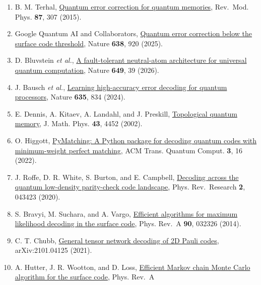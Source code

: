 \documentclass[
  10pt,
]{article}
\providecommand{\tightlist}{%
  \setlength{\itemsep}{0pt}\setlength{\parskip}{0pt}}
\begin{document}
\begin{enumerate}
\def\labelenumi{[\arabic{enumi}]}
\tightlist
\item
  \hypertarget{ref:1}{} B. M. Terhal, \href{https://doi.org/10.1103/RevModPhys.87.307}{Quantum
  error correction for quantum memories}, Rev.~Mod. Phys. \textbf{87},
  307 (2015).
\item
  \hypertarget{ref:2}{} Google Quantum AI and Collaborators,
  \href{https://doi.org/10.1038/s41586-024-08449-y}{Quantum error
  correction below the surface code threshold}, Nature \textbf{638}, 920
  (2025).
\item
  \hypertarget{ref:3}{} D. Bluvstein \emph{et al.},
  \href{https://doi.org/10.1038/s41586-025-09848-5}{A fault-tolerant
  neutral-atom architecture for universal quantum computation}, Nature
  \textbf{649}, 39 (2026).
\item
  \hypertarget{ref:4}{} J. Bausch \emph{et al.},
  \href{https://doi.org/10.1038/s41586-024-08148-8}{Learning
  high-accuracy error decoding for quantum processors}, Nature
  \textbf{635}, 834 (2024).
\item
  \hypertarget{ref:5}{} E. Dennis, A. Kitaev, A. Landahl, and J. Preskill,
  \href{https://doi.org/10.1063/1.1499754}{Topological quantum memory},
  J. Math. Phys. \textbf{43}, 4452 (2002).
\item
  \hypertarget{ref:6}{} O. Higgott, \href{https://doi.org/10.1145/3505637}{PyMatching: A
  Python package for decoding quantum codes with minimum-weight perfect
  matching}, ACM Trans. Quantum Comput. \textbf{3}, 16 (2022).
\item
  \hypertarget{ref:7}{} J. Roffe, D. R. White, S. Burton, and E. Campbell,
  \href{https://doi.org/10.1103/PhysRevResearch.2.043423}{Decoding
  across the quantum low-density parity-check code landscape}, Phys.
  Rev.~Research \textbf{2}, 043423 (2020).
\item
  \hypertarget{ref:8}{} S. Bravyi, M. Suchara, and A. Vargo,
  \href{https://doi.org/10.1103/PhysRevA.90.032326}{Efficient algorithms
  for maximum likelihood decoding in the surface code}, Phys. Rev.~A
  \textbf{90}, 032326 (2014).
\item
  \hypertarget{ref:9}{} C. T. Chubb, \href{https://arxiv.org/abs/2101.04125}{General tensor
  network decoding of 2D Pauli codes}, arXiv:2101.04125 (2021).
\item
  \hypertarget{ref:10}{} A. Hutter, J. R. Wootton, and D. Loss,
  \href{https://doi.org/10.1103/PhysRevA.89.022326}{Efficient Markov
  chain Monte Carlo algorithm for the surface code}, Phys. Rev.~A

\end{enumerate}
\end{document}
